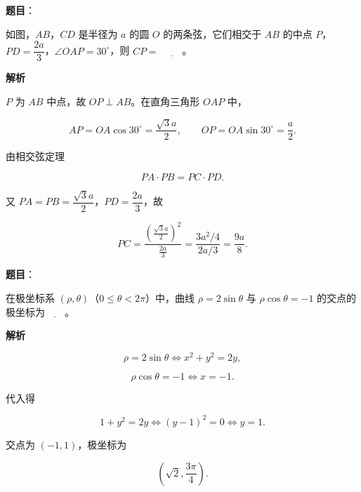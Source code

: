 \begin{answer}

\textbf{题目}：

如图，$AB$，$CD$ 是半径为 $a$ 的圆 $O$ 的两条弦，它们相交于 $AB$ 的中点 $P$，$PD=\dfrac{2a}3$，$\angle OAP=30^\circ$，则 $CP=$ $\underline{\qquad}$。
\nopagebreak[4]
\begin{center}\end{center}
\nopagebreak[4]
\textbf{解析}

$P$ 为 $AB$ 中点，故 $OP\perp AB$。在直角三角形 $OAP$ 中，

\nopagebreak[4]
\[AP=OA\cos30^\circ=\frac{\sqrt3a}2,\qquad OP=OA\sin30^\circ=\frac a2.\]

由相交弦定理

\nopagebreak[4]
\[PA\cdot PB=PC\cdot PD.\]

又 $PA=PB=\dfrac{\sqrt3a}2$，$PD=\dfrac{2a}3$，故

\nopagebreak[4]
\[PC=\frac{\left(\frac{\sqrt3a}2\right)^2}{\frac{2a}3}
=\frac{3a^2/4}{2a/3}
=\frac{9a}8.\]


\end{answer}
\begin{answer}

\textbf{题目}：

在极坐标系 $(\rho,\theta)$（$0\leqslant\theta<2\pi$）中，曲线 $\rho=2\sin\theta$ 与 $\rho\cos\theta=-1$ 的交点的极坐标为$\underline{\qquad}$。

\textbf{解析}

\nopagebreak[4]
\[\rho=2\sin\theta\iff x^2+y^2=2y,\]

\nopagebreak[4]
\[\rho\cos\theta=-1\iff x=-1.\]

代入得

\nopagebreak[4]
\[1+y^2=2y\iff (y-1)^2=0\iff y=1.\]

交点为 $(-1,1)$，极坐标为

\nopagebreak[4]
\[\left(\sqrt2,\frac{3\pi}4\right).\]


\end{answer}
